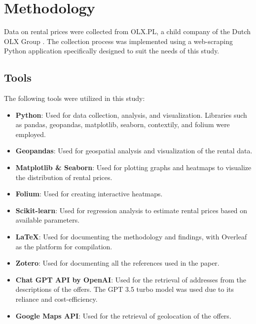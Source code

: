\section{Methodology}
Data on rental prices were collected from OLX.PL, a child company of the Dutch OLX Group \cite{noauthor_meet_nodate}. The collection process was implemented using a web-scraping Python application specifically designed to suit the needs of this study.

\subsection{Tools}
The following tools were utilized in this study:
\begin{itemize}
\item \textbf{Python}: Used for data collection, analysis, and visualization. Libraries such as pandas, geopandas, matplotlib, seaborn, contextily, and folium were employed.
\item \textbf{Geopandas}: Used for geospatial analysis and visualization of the rental data.
\item \textbf{Matplotlib & Seaborn}: Used for plotting graphs and heatmaps to visualize the distribution of rental prices.
\item \textbf{Folium}: Used for creating interactive heatmaps.
\item \textbf{Scikit-learn}: Used for regression analysis to estimate rental prices based on available parameters.
\item \textbf{LaTeX}: Used for documenting the methodology and findings, with Overleaf as the platform for compilation.
\item \textbf{Zotero}: Used for documenting all the references used in the paper.
\item \textbf{Chat GPT API by OpenAI}: Used for the retrieval of addresses from the descriptions of the offers. The GPT 3.5 turbo model was used due to its reliance and cost-efficiency.
\item \textbf{Google Maps API}: Used for the retrieval of geolocation of the offers.
\end{itemize}

